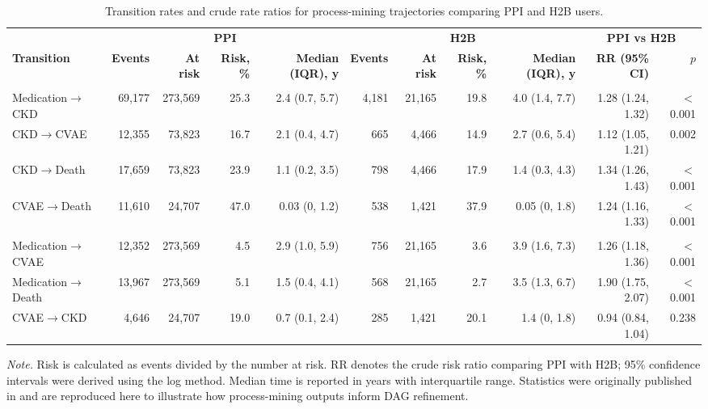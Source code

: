 \documentclass[sn-vancouver-num]{sn-jnl}
\begin{document}
\begin{table}
\caption{Transition rates and crude rate ratios for process-mining trajectories comparing PPI and H2B users.}
\label{tab:transitions}
\centering
\tiny
\setlength{\tabcolsep}{2.5pt}
\renewcommand{\arraystretch}{1.12}
\begin{tabularx}{\textheight}{@{}>{\raggedright\arraybackslash}p{2.7cm}rrrrrrrrrr@{}}
\toprule
 & \multicolumn{4}{c}{\textbf{PPI}} & \multicolumn{4}{c}{\textbf{H2B}} & \multicolumn{2}{c}{\textbf{PPI vs H2B}} \\
\cmidrule(lr){2-5} \cmidrule(lr){6-9} \cmidrule(l){10-11}
\textbf{Transition} & \textbf{Events} & \textbf{At risk} & \textbf{Risk, \%} & \textbf{Median (IQR), y} & \textbf{Events} & \textbf{At risk} & \textbf{Risk, \%} & \textbf{Median (IQR), y} & \textbf{RR (95\% CI)} & \textbf{$p$} \\
\midrule
\multicolumn{11}{@{}l}{\textit{Key transitions used for DAG refinement}} \\
Medication$\to$CKD & 69,177 & 273,569 & 25.3 & 2.4 (0.7, 5.7) & 4,181 & 21,165 & 19.8 & 4.0 (1.4, 7.7) & 1.28 (1.24, 1.32) & $<$0.001 \\
CKD$\to$CVAE & 12,355 & 73,823 & 16.7 & 2.1 (0.4, 4.7) & 665 & 4,466 & 14.9 & 2.7 (0.6, 5.4) & 1.12 (1.05, 1.21) & 0.002 \\
CKD$\to$Death & 17,659 & 73,823 & 23.9 & 1.1 (0.2, 3.5) & 798 & 4,466 & 17.9 & 1.4 (0.3, 4.3) & 1.34 (1.26, 1.43) & $<$0.001 \\
CVAE$\to$Death & 11,610 & 24,707 & 47.0 & 0.03 (0, 1.2) & 538 & 1,421 & 37.9 & 0.05 (0, 1.8) & 1.24 (1.16, 1.33) & $<$0.001 \\
\addlinespace[2pt]
\multicolumn{11}{@{}l}{\textit{Additional observed transitions}} \\
Medication$\to$CVAE & 12,352 & 273,569 & 4.5 & 2.9 (1.0, 5.9) & 756 & 21,165 & 3.6 & 3.9 (1.6, 7.3) & 1.26 (1.18, 1.36) & $<$0.001 \\
Medication$\to$Death & 13,967 & 273,569 & 5.1 & 1.5 (0.4, 4.1) & 568 & 21,165 & 2.7 & 3.5 (1.3, 6.7) & 1.90 (1.75, 2.07) & $<$0.001 \\
CVAE$\to$CKD & 4,646 & 24,707 & 19.0 & 0.7 (0.1, 2.4) & 285 & 1,421 & 20.1 & 1.4 (0, 1.8) & 0.94 (0.84, 1.04) & 0.238 \\
\bottomrule
\end{tabularx}
\par\smallskip
\noindent\scriptsize\textit{Note.} Risk is calculated as events divided by the number at risk. RR denotes the crude risk ratio comparing PPI with H2B; 95\% confidence intervals were derived using the log method. Median time is reported in years with interquartile range. Statistics were originally published in \citep{chen2025} and are reproduced here to illustrate how process-mining outputs inform DAG refinement.
\end{table}
\end{document}
